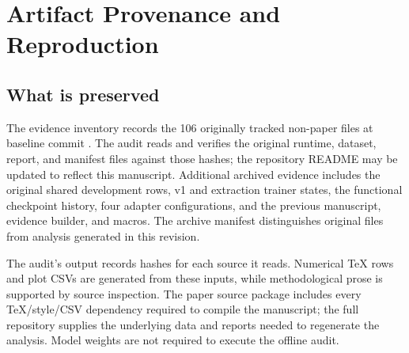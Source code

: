 \section{Artifact Provenance and Reproduction}
\label{app:artifacts}
\subsection{What is preserved}
The evidence inventory records the 106 originally tracked non-paper files at baseline commit . The audit reads and verifies the original runtime, dataset, report, and manifest files against those hashes; the repository README may be updated to reflect this manuscript. Additional archived evidence includes the original shared development rows, v1 and extraction trainer states, the functional checkpoint history, four adapter configurations, and the previous manuscript, evidence builder, and macros. The archive manifest distinguishes original files from analysis generated in this revision.

The audit's output records hashes for each source it reads. Numerical TeX rows and plot CSVs are generated from these inputs, while methodological prose is supported by source inspection. The paper source package includes every TeX/style/CSV dependency required to compile the manuscript; the full repository supplies the underlying data and reports needed to regenerate the analysis. Model weights are not required to execute the offline audit.

